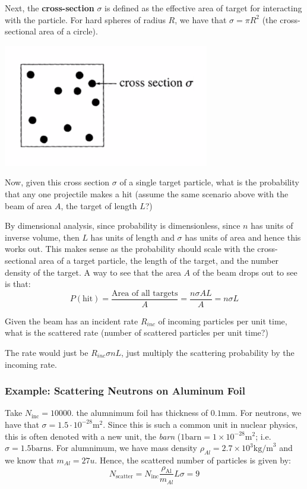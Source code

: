 Next, the \textbf{cross-section} $\sigma$ is defined as the effective area of target for interacting with the particle. For hard spheres of radius $R$, we have that $\sigma = \pi R^2$ (the cross-sectional area of a circle). 
\begin{center}
    \includegraphics[scale=0.8]{Lecture-27/l27-img5.png}
\end{center}
Now, given this cross section $\sigma$ of a single target particle, what is the probability that any one projectile makes a hit (assume the same scenario above with the beam of area $A$, the target of length $L$?)
\begin{s}
By dimensional analysis, since probability is dimensionless, since $n$ has units of inverse volume, then $L$ has units of length and $\sigma$ has units of area and hence this works out. This makes sense as the probability should scale with the cross-sectional area of a target particle, the length of the target, and the number density of the target. A way to see that the area $A$ of the beam drops out to see is that:
\[P(\text{hit}) = \frac{\text{Area of all targets}}{A} = \frac{n\sigma A L}{A} = n\sigma L\]
\end{s}
Given the beam has an incident rate $R_{inc}$ of incoming particles per unit time, what is the scattered rate (number of scattered particles per unit time?)
\begin{s}
The rate would just be $R_{inc}\sigma n L$, just multiply the scattering probability by the incoming rate.
\end{s}

\subsubsection{Example: Scattering Neutrons on Aluminum Foil}
Take $N_{\text{inc}} = 10000$. the alumnimum foil has thickness of $0.1\text{mm}$. For neutrons, we have that $\sigma = 1.5 \cdot 10^{-28}\text{m}^2$. Since this is such a common unit in nuclear physics, this is often denoted with a new unit, the \textit{barn} ($1 \text{barn} = 1\times 10^{-28}\text{m}^2$; i.e. $\sigma = 1.5\text{barns}$. For alumnimum, we have mass density $\rho_{Al} = 2.7\times 10^3 \text{kg/m}^3$ and we know that $m_{Al} = 27u$. Hence, the scattered number of particles is given by:
\[N_{\text{scatter}} = N_{\text{inc}}\frac{\rho_{\text{Al}}}{m_{Al}}L\sigma = 9\]


